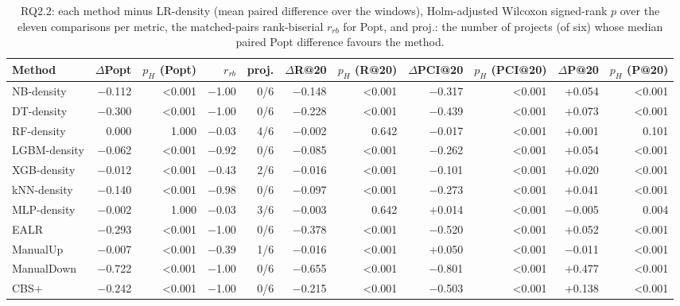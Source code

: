 \begin{table}[t]
\centering
\footnotesize
\caption{RQ2.2: each method minus LR-density (mean paired difference over the windows), Holm-adjusted Wilcoxon signed-rank $p$ over the eleven comparisons per metric, the matched-pairs rank-biserial $r_{rb}$ for Popt, and proj.: the number of projects (of six) whose median paired Popt difference favours the method.}
\label{tab:p2-rq2}
\begin{adjustbox}{max width=\linewidth}
\begin{tabular}{lrrrrrrrrrr}
\toprule
Method & $\Delta$Popt & $p_H$ (Popt) & $r_{rb}$ & proj. & $\Delta$R@20 & $p_H$ (R@20) & $\Delta$PCI@20 & $p_H$ (PCI@20) & $\Delta$P@20 & $p_H$ (P@20) \\
\midrule
NB-density & $-$0.112 & <0.001 & $-$1.00 & 0/6 & $-$0.148 & <0.001 & $-$0.317 & <0.001 & +0.054 & <0.001 \\
DT-density & $-$0.300 & <0.001 & $-$1.00 & 0/6 & $-$0.228 & <0.001 & $-$0.439 & <0.001 & +0.073 & <0.001 \\
RF-density & 0.000 & 1.000 & $-$0.03 & 4/6 & $-$0.002 & 0.642 & $-$0.017 & <0.001 & +0.001 & 0.101 \\
LGBM-density & $-$0.062 & <0.001 & $-$0.92 & 0/6 & $-$0.085 & <0.001 & $-$0.262 & <0.001 & +0.054 & <0.001 \\
XGB-density & $-$0.012 & <0.001 & $-$0.43 & 2/6 & $-$0.016 & <0.001 & $-$0.101 & <0.001 & +0.020 & <0.001 \\
kNN-density & $-$0.140 & <0.001 & $-$0.98 & 0/6 & $-$0.097 & <0.001 & $-$0.273 & <0.001 & +0.041 & <0.001 \\
MLP-density & $-$0.002 & 1.000 & $-$0.03 & 3/6 & $-$0.003 & 0.642 & +0.014 & <0.001 & $-$0.005 & 0.004 \\
EALR & $-$0.293 & <0.001 & $-$1.00 & 0/6 & $-$0.378 & <0.001 & $-$0.520 & <0.001 & +0.052 & <0.001 \\
ManualUp & $-$0.007 & <0.001 & $-$0.39 & 1/6 & $-$0.016 & <0.001 & +0.050 & <0.001 & $-$0.011 & <0.001 \\
ManualDown & $-$0.722 & <0.001 & $-$1.00 & 0/6 & $-$0.655 & <0.001 & $-$0.801 & <0.001 & +0.477 & <0.001 \\
CBS+ & $-$0.242 & <0.001 & $-$1.00 & 0/6 & $-$0.215 & <0.001 & $-$0.503 & <0.001 & +0.138 & <0.001 \\
\bottomrule
\end{tabular}
\end{adjustbox}
\end{table}

